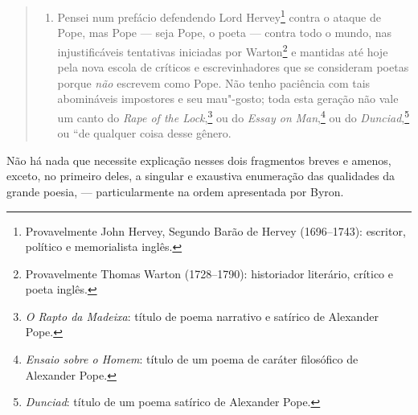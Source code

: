 \begin{quote}
\begin{enumerate}[label=(\arabic*)]
\item\mbox{} Pensei num prefácio defendendo Lord Hervey\footnote{Provavelmente
  John Hervey, Segundo Barão de Hervey (1696--1743): escritor, político e
  memorialista inglês.} contra o ataque de Pope, mas Pope
--- seja Pope, o poeta --- contra todo o mundo, nas injustificáveis
tentativas iniciadas por Warton\footnote{Provavelmente Thomas Warton
  (1728--1790): historiador literário, crítico e poeta inglês.} e mantidas até hoje pela nova escola de críticos e
escrevinhadores que se consideram poetas porque \textit{não} escrevem como
Pope. Não tenho paciência com tais abomináveis impostores e seu
mau"-gosto; toda esta geração não vale um canto do \textit{Rape of the
Lock},\footnote{\textit{O Rapto da Madeixa}: título de poema narrativo e
  satírico de Alexander Pope.} ou do \textit{Essay on}
\textit{Man},\footnote{\textit{Ensaio sobre o Homem}: título de um poema de
  caráter filosófico de Alexander Pope.} ou do
\textit{Dunciad},\footnote{\textit{Dunciad}: título de um poema satírico de
  Alexander Pope.} ou ``de qualquer coisa desse
gênero.
\end{enumerate}
\end{quote}

Não há nada que necessite explicação nesses dois fragmentos breves
e amenos, exceto, no primeiro deles, a singular e exaustiva enumeração
das qualidades da grande poesia, --- particularmente na ordem apresentada
por Byron.

